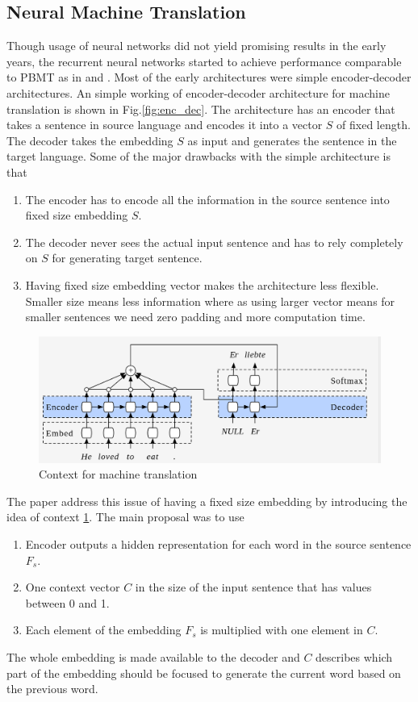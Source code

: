 \documentclass[conference]{IEEEtran}
\begin{document}
\subsection{Neural Machine Translation}
Though usage of neural networks did not yield promising results in the early years, the recurrent neural networks started to achieve performance comparable to PBMT as in \cite{kalchbrenner2013recurrent} and \cite{hermann2013multilingual}. Most of the early architectures were simple encoder-decoder architectures. An simple working of encoder-decoder architecture for machine translation is shown in Fig.\ref{fig:enc_dec}. The architecture has an encoder that takes a sentence in source language and encodes it into a vector $S$ of fixed length. The decoder takes the embedding $S$ as input and generates the sentence in the target language. Some of the major drawbacks with the simple architecture is that
\begin{enumerate}
 \item The encoder has to encode all the information in the source sentence into fixed size embedding $S$. 
 \item The decoder never sees the actual input sentence and has to rely completely on $S$ for generating target sentence. 
 \item Having fixed size embedding vector makes the architecture less flexible. Smaller size means less information where as using larger vector means for smaller sentences we need zero padding and more computation time.
\end{enumerate}


\begin{figure}
    \includegraphics[width=.99\linewidth]{img/context.png}  
    \caption{Context for machine translation} 
    \label{fig:context}
\end{figure}

The paper \cite{bahdanau2014neural} address this issue of having a fixed size embedding by introducing the idea of context \ref{fig:context}. The main proposal was to use
\begin{enumerate}
 \item Encoder outputs a hidden representation for each word in the source sentence $F_s$.
 \item One context vector $C$ in the size of the input sentence that has values between 0 and 1.
 \item Each element of the embedding $F_s$ is multiplied with one element in $C$.
\end{enumerate}
The whole embedding is made available to the decoder and $C$ describes which part of the embedding should be focused to generate the current word based on the previous word.
\end{document}
